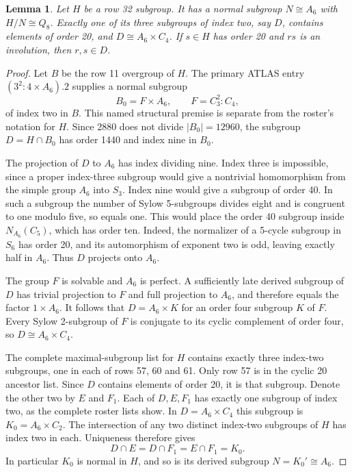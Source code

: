 \documentclass[11pt,a4paper]{article}
\newtheorem{lemma}{Lemma}\newtheorem{theorem}{Theorem}
\begin{document}
\begin{lemma}\label{intersection}
Let $H$ be a row 32 subgroup. It has a normal subgroup $N\cong A_6$
with $H/N\cong Q_8$. Exactly one of its three subgroups of index two,
say $D$, contains elements of order 20, and $D\cong A_6\times C_4$.
If $s\in H$ has order 20 and $rs$ is an involution, then $r,s\in D$.
\end{lemma}
\begin{proof}
Let $B$ be the row 11 overgroup of $H$. The primary ATLAS entry
$(3^2:4\times A_6).2$ supplies a normal subgroup
\[
 B_0=F\times A_6,\qquad F=C_3^2:C_4,
\]
of index two in $B$. This named structural premise is separate from
the roster's notation for $H$. Since 2880 does not divide
$|B_0|=12960$, the subgroup $D=H\cap B_0$ has order 1440 and index
nine in $B_0$.

The projection of $D$ to $A_6$ has index dividing nine. Index three
is impossible, since a proper index-three subgroup would give a
nontrivial homomorphism from the simple group $A_6$ into $S_3$.
Index nine would give a subgroup of order 40. In such a subgroup the
number of Sylow 5-subgroups divides eight and is congruent to one
modulo five, so equals one. This would place the order 40 subgroup
inside $N_{A_6}(C_5)$, which has order ten. Indeed, the normalizer
of a 5-cycle subgroup in $S_6$ has order 20, and its automorphism
of exponent two is odd, leaving exactly half in $A_6$.
Thus $D$ projects onto $A_6$.

The group $F$ is solvable and $A_6$ is perfect. A sufficiently late
derived subgroup of $D$ has trivial projection to $F$ and full
projection to $A_6$, and therefore equals the factor $1\times A_6$.
It follows that $D=A_6\times K$ for an order four subgroup $K$ of
$F$. Every Sylow 2-subgroup of $F$ is conjugate to its cyclic
complement of order four, so $D\cong A_6\times C_4$.

The complete maximal-subgroup list for $H$ contains exactly three
index-two subgroups, one in each of rows 57, 60 and 61. Only row 57
is in the cyclic 20 ancestor list. Since $D$ contains elements of
order 20, it is that subgroup. Denote the other two by $E$ and $F_1$.
Each of $D,E,F_1$ has exactly one subgroup of index two, as the
complete roster lists show. In $D=A_6\times C_4$ this subgroup is
$K_0=A_6\times C_2$. The intersection of any two distinct index-two
subgroups of $H$ has index two in each. Uniqueness therefore gives
\[
             D\cap E=D\cap F_1=E\cap F_1=K_0.
\]
In particular $K_0$ is normal in $H$, and so is its derived subgroup
$N=K_0'\cong A_6$.


\end{proof}
\end{document}
